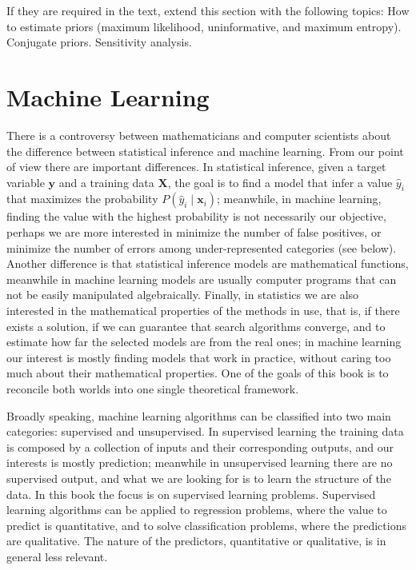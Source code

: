 {\color{red} If they are required in the text, extend this section with the following topics: How to estimate priors (maximum likelihood, uninformative, and maximum entropy). Conjugate priors. Sensitivity analysis.}

%
%

\section{Machine Learning}
\label{sec:machine_learning}

There is a controversy between mathematicians and computer scientists about the difference between statistical inference and machine learning. From our point of view there are important differences. In statistical inference, given a target variable $\mathbf{y}$ and a training data $\mathbf{X}$, the goal is to find a model that infer a value $\hat{y}_i$ that maximizes the probability $P(\hat{y}_i \mid \mathbf{x}_i)$; meanwhile, in machine learning, finding the value with the highest probability is not necessarily our objective, perhaps we are more interested in minimize the number of false positives, or minimize the number of errors among under-represented categories (see below). Another difference is that statistical inference models are mathematical functions, meanwhile in machine learning models are usually computer programs that can not be easily manipulated algebraically. Finally, in statistics we are also interested in the mathematical properties of the methods in use, that is, if there exists a solution, if we can guarantee that search algorithms converge, and to estimate how far the selected models are from the real ones; in machine learning our interest is mostly finding models that work in practice, without caring too much about their mathematical properties. One of the goals of this book is to reconcile both worlds into one single theoretical framework.

Broadly speaking, machine learning algorithms can be classified into two main categories: supervised and unsupervised. In supervised learning the training data is composed by a collection of inputs and their corresponding outputs, and our interests is mostly prediction; meanwhile in unsupervised learning there are no supervised output, and what we are looking for is to learn the structure of the data. In this book the focus is on supervised learning problems. Supervised learning algorithms can be applied to regression problems, where the value to predict is quantitative, and to solve classification problems, where the predictions are qualitative. The nature of the predictors, quantitative or qualitative, is in general less relevant.


